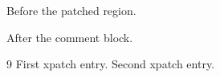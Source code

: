 \documentclass{article}
\begin{document}
Before the patched region.

After the comment block.
\begin{thebibliography}{9}
 First xpatch entry.
 Second xpatch entry.
\end{thebibliography}
\end{document}
